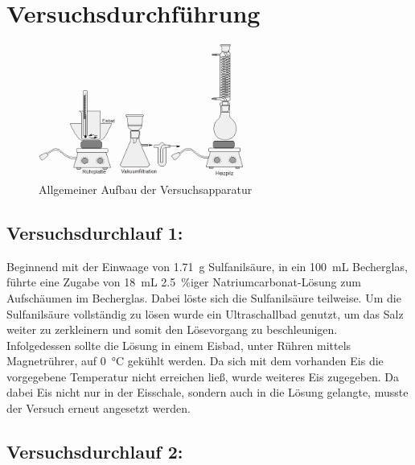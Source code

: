 \section{Versuchsdurchführung}
\label{sec:durchfuerung}
\begin{figure}[h!]
	\centering
	\includegraphics[width=0.6\textwidth]{img/versuchsaufbau_1}
	\caption{Allgemeiner Aufbau der Versuchsapparatur}
	\label{fig:versuchsaufbau_1}
\end{figure}
\FloatBarrier

\subsection{Versuchsdurchlauf  1: }
Beginnend mit der Einwaage von \SI{1,71}{\gram} Sulfanilsäure, in ein \SI{100}{\milli \liter} Becherglas, führte eine Zugabe von \SI{18}{\milli \liter} \SI{2,5}{\percent}iger Natriumcarbonat-Lösung zum Aufschäumen im Becherglas.
Dabei löste sich die Sulfanilsäure teilweise. Um die Sulfanilsäure vollständig zu lösen wurde ein Ultraschallbad genutzt, um das Salz weiter zu zerkleinern und somit den Lösevorgang zu beschleunigen.\\
Infolgedessen sollte die Lösung in einem Eisbad, unter Rühren mittels Magnetrührer, auf \SI{0}{\celsius} gekühlt werden. Da sich mit dem vorhanden Eis die vorgegebene Temperatur nicht erreichen ließ, wurde weiteres Eis zugegeben. Da dabei Eis nicht nur in der Eisschale, sondern auch in die Lösung gelangte, musste der Versuch erneut angesetzt werden.

\subsection{Versuchsdurchlauf 2: }
